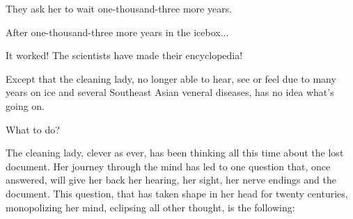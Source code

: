 \documentclass[a4paper]{article}
\begin{document}
They ask her to wait one-thousand-three more years.

\begin{comment}
on lui demande de bien vouloir patienter 1 003 ans supplémentaires…
\end{comment}

After one-thousand-three more years in the icebox...

\begin{comment}
au bout des 1 003 ans de gel supplémentaires…
\end{comment}

It worked!  The scientists have made their encyclopedia!

\begin{comment}
Ça a bien marché! Les chercheurs ont fini l'encyclopédie.
\end{comment}

Except that the cleaning lady, no longer able to hear, see or feel due to
many years on ice and several Southeast Asian veneral diseases, has no idea
what's going on.

\begin{comment}
Sauf que la femme, dépourvue de son ouïe, sa vue et toute sensation
corporelle à cause de cette longue période de congélation à laquelle se
rajoutent de nombreuses maladies vénériennes contractées en Asie du Sud, n’en est
pas consciente.
\end{comment}

What to do?

\begin{comment}
Que faire ?
\end{comment}

The cleaning lady, clever as ever, has been thinking all this time about the
lost document.  Her journey through the mind has led to one question
that, once answered, will give her back her hearing, her sight, her nerve
endings and the document.  This question, that has
taken shape in her head for twenty centuries, monopolizing her mind,
eclipsing all other thought, is the following:

\begin{comment}
La femme de ménage, toujours futée, s’est elle aussi penchée sur la problématique
du document pendant les 2 006 ans de gel. Ses nombreux calculs ont abouti
à une question qui, une fois résolue, lui redonnerait à la fois l’ouïe, la vue,
les terminaisons nerveuses et le contenu du document. Cette question, qui se
forme dans sa tête depuis vingt siècles, monopolisant son esprit, éclipsant
toute autre pensée, est la question suivante :
\end{comment}
\end{document}
